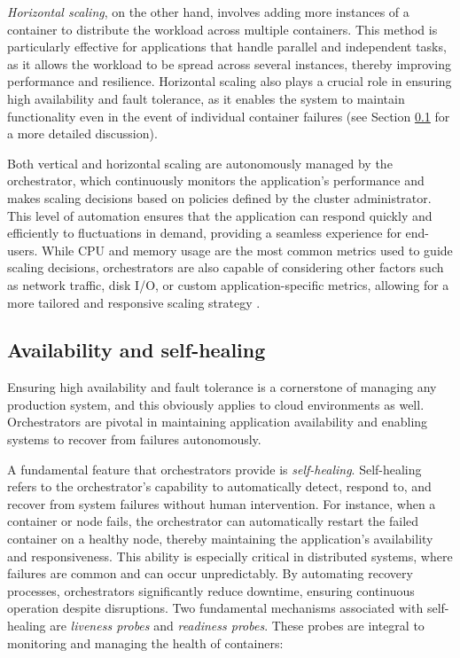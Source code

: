 \textit{Horizontal scaling}, on the other hand, involves adding more instances of a
container to distribute the workload across multiple containers.
This method is particularly effective for applications that handle parallel and
independent tasks, as it allows the workload to be spread across several
instances, thereby improving performance and resilience.
Horizontal scaling also plays a crucial role in ensuring high availability and
fault tolerance, as it enables the system to maintain functionality even in the
event of individual container failures (see Section
\ref{subsec:chpt1-availability} for a more detailed discussion).

Both vertical and horizontal scaling are autonomously managed by the
orchestrator, which continuously monitors the application's performance and
makes scaling decisions based on policies defined by the cluster administrator.
This level of automation ensures that the application can respond quickly and
efficiently to fluctuations in demand, providing a seamless experience for
end-users.
While CPU and memory usage are the most common metrics used to guide scaling
decisions, orchestrators are also capable of considering other factors such as
network traffic, disk I/O, or custom application-specific metrics, allowing for
a more tailored and responsive scaling strategy \cite{Qu2016}.

\subsection{Availability and self-healing}\label{subsec:chpt1-availability}

Ensuring high availability and fault tolerance is a cornerstone of managing any
production system, and this obviously applies to cloud environments as well.
Orchestrators are pivotal in maintaining application availability and enabling
systems to recover from failures autonomously.

A fundamental feature that orchestrators provide is \textit{self-healing}.
Self-healing refers to the orchestrator's capability to automatically detect,
respond to, and recover from system failures without human intervention.
For instance, when a container or node fails, the orchestrator can automatically
restart the failed container on a healthy node, thereby maintaining the
application's availability and responsiveness.
This ability is especially critical in distributed systems, where failures are
common and can occur unpredictably.
By automating recovery processes, orchestrators significantly reduce downtime,
ensuring continuous operation despite disruptions.
Two fundamental mechanisms associated with self-healing are \textit{liveness
  probes} and \textit{readiness probes}. These probes are integral to monitoring
and managing the health of containers:

